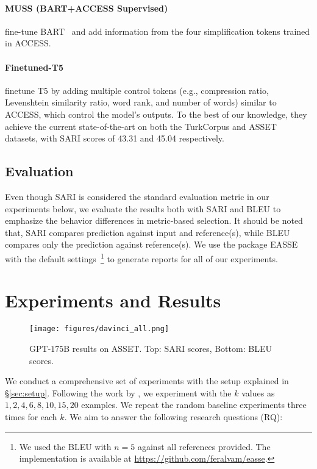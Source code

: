 \documentclass[11pt]{article}
\begin{document}
    \paragraph{MUSS (BART+ACCESS Supervised)} \citet{martin-etal-2022-muss} fine-tune BART~\citep{bart} and add information from the four simplification tokens trained in ACCESS. 
    
    \paragraph{Finetuned-T5} \citet{sheang-saggion-2021-controllable} finetune T5 by adding multiple control tokens (e.g., compression ratio, Levenshtein similarity ratio, word rank, and number of words) similar to ACCESS, which control the model's outputs. To the best of our knowledge, they achieve the current state-of-the-art on both the TurkCorpus and ASSET datasets, with SARI scores of 43.31 and 45.04 respectively.

\subsection{Evaluation}
Even though SARI is considered the standard evaluation metric in our experiments below, we evaluate the results both with SARI and BLEU to emphasize the behavior differences in metric-based selection. It should be noted that, SARI compares prediction against input and reference(s), while BLEU compares only the prediction against reference(s). We use the package EASSE~\citep{alva-manchego-etal-2019-easse} with the default settings~\footnote{We used the BLEU with $n=5$ against all references provided. The implementation is available at \url{https://github.com/feralvam/easse}.} to generate reports for all of our experiments. 

\section{Experiments and Results}
\begin{figure}[]
    \centering
    \texttt{[image: figures/davinci\_all.png]}
    \caption{GPT-$175$B results on ASSET. Top: SARI scores, Bottom: BLEU scores.}
    \label{fig:davinci_asset_all}
\end{figure}
We conduct a comprehensive set of experiments with the setup explained in \S \ref{sec:setup}. Following the work by \citet{lu-etal-2022-fantastically}, we experiment with the $k$ values as $1,2,4,6,8,10,15,20$ examples. We repeat the random baseline experiments three times for each $k$. We aim to answer the following research questions (RQ):
\end{document}
